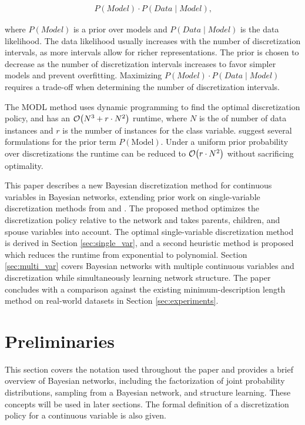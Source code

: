 \begin{align}
P(\textit{Model}) \cdot P(\textit{Data} \mid \textit{Model})\text{,}
\end{align}

\noindent
where $P(\textit{Model})$ is a prior over models and ${P(\textit{Data} \mid \textit{Model})}$ is the data likelihood.
The data likelihood usually increases with the number of discretization intervals, as more intervals allow for richer representations.
The prior is chosen to decrease as the number of discretization intervals increases to favor simpler models and prevent overfitting.
Maximizing ${P(\textit{Model}) \cdot P(\textit{Data} \mid \textit{Model})}$ requires a trade-off when determining the number of discretization intervals.

The MODL method uses dynamic programming to find the optimal discretization policy, and has an $\bigo\paren{N^3 + r \cdot N^2}$ runtime, where $N$ is the of number of data instances and $r$ is the number of instances for the class variable.
\cite{Lustgarten_2011} suggest several formulations for the prior term $P(\text{Model})$.
Under a uniform prior probability over discretizations the runtime can be reduced to $\bigo\paren{r \cdot N^2}$ without sacrificing optimality.

This paper describes a new Bayesian discretization method for continuous variables in Bayesian networks, extending prior work on single-variable discretization methods from \citet{Boulle_2006} and \citet{Lustgarten_2011}.
The proposed method optimizes the discretization policy relative to the network and takes parents, children, and spouse variables into account.
The optimal single-variable discretization method is derived in Section \ref{sec:single_var}, and a second heuristic method is proposed which reduces the runtime from exponential to polynomial.
Section \ref{sec:multi_var} covers Bayesian networks with multiple continuous variables and discretization while simultaneously learning network structure.
The paper concludes with a comparison against the existing minimum-description length \citep{Friedman_1996} method on real-world datasets in Section \ref{sec:experiments}.


\section{Preliminaries}
\label{sec:preliminaries}
This section covers the notation used throughout the paper and provides a brief overview of Bayesian networks, including the factorization of joint probability distributions, sampling from a Bayesian network, and structure learning.
These concepts will be used in later sections.
The formal definition of a discretization policy for a continuous variable is also given.

